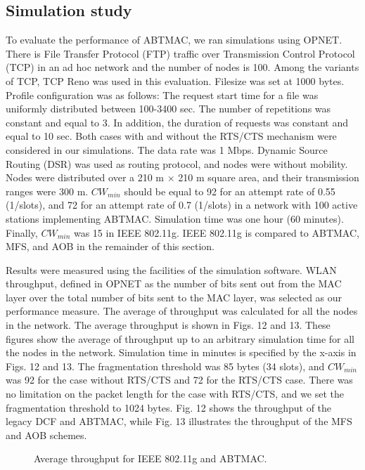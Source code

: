 \documentclass[10pt,twocolumn,oneside,submit]{JCNtran}
\begin{document}
\subsection{Simulation study}
\par To evaluate the performance of ABTMAC, we ran simulations using OPNET. There is File Transfer Protocol (FTP) traffic over Transmission Control Protocol (TCP) in an ad hoc network and the number of nodes is 100. Among the variants of TCP, TCP Reno was used in this evaluation. Filesize was set at 1000 bytes. Profile configuration was as follows: The request start time for a file was uniformly distributed between 100-3400 sec. The number of repetitions was constant and equal to 3. In addition, the duration of requests was constant and equal to 10 sec. Both cases with and without the RTS/CTS mechanism were considered in our simulations. The data rate was 1 Mbps. Dynamic Source Routing (DSR) was used as routing protocol, and nodes were without mobility. Nodes were distributed over a 210 m $\times $ 210 m square area, and their transmission ranges were 300 m. $CW_{min}$ should be equal to 92 for an attempt rate of 0.55 (1/slots), and 72 for an attempt rate of 0.7 (1/slots) in a network with 100 active stations implementing ABTMAC. Simulation time was one hour (60 minutes). Finally, $CW_{min}$ was 15 in IEEE 802.11g. IEEE 802.11g is compared to ABTMAC, MFS, and AOB in the remainder of this section.
\par Results were measured using the facilities of the simulation software. WLAN throughput, defined in OPNET as the number of bits sent out from the MAC layer over the total number of bits sent to the MAC layer, was selected as our performance measure. The average of throughput was calculated for all the nodes in the network. The average throughput is shown in Figs. 12 and 13. These figures show the average of throughput up to an arbitrary simulation time for all the nodes in the network. Simulation time in minutes is specified by the x-axis in Figs. 12 and 13. The fragmentation threshold was 85 bytes (34 slots), and $CW_{min}$ was 92 for the case without RTS/CTS and 72 for the RTS/CTS case. There was no limitation on the packet length for the case with RTS/CTS, and we set the fragmentation threshold to 1024 bytes. Fig. 12 shows the throughput of the legacy DCF and ABTMAC, while Fig. 13 illustrates the throughput of the MFS and AOB schemes.
\begin{figure}[!t]
\begin{center}
\epsfxsize=8cm \leavevmode{} \caption{Average throughput for IEEE 802.11g and ABTMAC.} \label{fig:12}
\end{center}
\end{figure}
\end{document}

